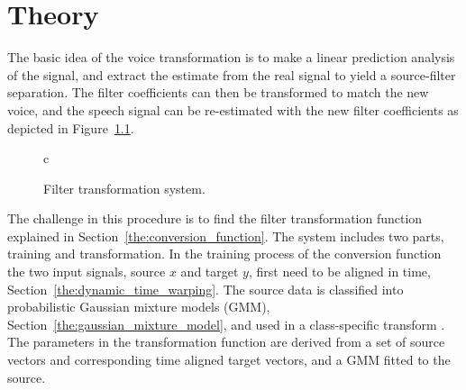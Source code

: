 \chapter{Theory} %
\label{cha:theory}
The basic idea of the voice transformation is to make a linear prediction analysis of the signal, and extract the estimate from the real signal to yield a source-filter separation. The filter coefficients can then be transformed to match the new voice, and the speech signal can be re-estimated with the new filter coefficients as depicted in Figure~\ref{fig:VC}.
\begin{figure}[htbp]
  \centering
   \begin{tabular}[h]{c}
  \end{tabular}
  \caption{Filter transformation system.}
  \label{fig:VC}
\end{figure}

The challenge in this procedure is to find the filter transformation function explained in Section~\ref{the:conversion_function}. The system includes two parts, training and transformation. 
In the training process of the conversion function the two input signals, source $x$ and target $y$, first need to be aligned in time, Section~\ref{the:dynamic_time_warping}. The source data is classified into probabilistic Gaussian mixture models (GMM), Section~\ref{the:gaussian_mixture_model}, and used in a class-specific transform \cite{stylianou09}. The parameters in the transformation function are derived from a set of source vectors and corresponding time aligned target vectors, and a GMM fitted to the source.


